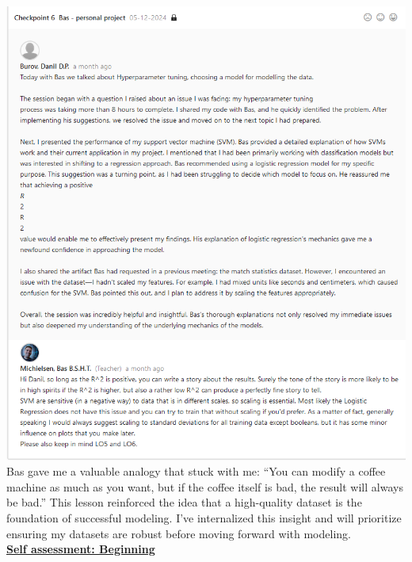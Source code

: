 \documentclass{article}
\begin{document}
	 \includegraphics[width=\textwidth]{images/Feedback_Bas_2.png}\\
	
	Bas gave me a valuable analogy that stuck with me: “You can modify a coffee machine as much as you want, but if the coffee itself is bad, the result will always be bad.” This lesson reinforced the idea that a high-quality dataset is the foundation of successful modeling. I’ve internalized this insight and will prioritize ensuring my datasets are robust before moving forward with modeling.\\
	  \underline{\textbf{Self assessment: Beginning}}
\end{document}
